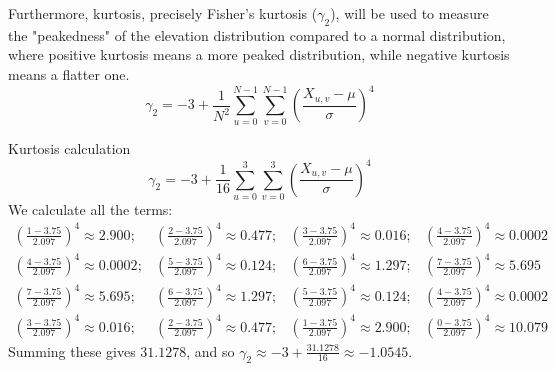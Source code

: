 Furthermore, kurtosis, precisely Fisher's kurtosis ($\gamma_2$), will be used to measure the "peakedness" of the elevation distribution compared to a normal 
distribution, where positive kurtosis means a more peaked distribution, while negative kurtosis means a flatter one.
\[\gamma_2=-3+\frac{1}{N^2}\sum_{u=0}^{N-1}\sum_{v=0}^{N-1}{\left(\frac{X_{u,v}-\mu}{\sigma}\right)}^4\]
\begin{example}{Kurtosis calculation}
    \[\gamma_2=-3+\frac{1}{16}\sum_{u=0}^{3}\sum_{v=0}^{3}{\left(\frac{X_{u,v}-\mu}{\sigma}\right)}^4\]
    We calculate all the terms:
    \begin{equation*}
        \begin{matrix}
            {\left(\frac{1-3.75}{2.097}\right)}^4\approx2.900; & {\left(\frac{2-3.75}{2.097}\right)}^4\approx0.477; & {\left(\frac{3-3.75}{2.097}\right)}^4\approx0.016; & {\left(\frac{4-3.75}{2.097}\right)}^4\approx0.0002 \\
            {\left(\frac{4-3.75}{2.097}\right)}^4\approx0.0002; & {\left(\frac{5-3.75}{2.097}\right)}^4\approx0.124; & {\left(\frac{6-3.75}{2.097}\right)}^4\approx1.297; & {\left(\frac{7-3.75}{2.097}\right)}^4\approx5.695 \\
            {\left(\frac{7-3.75}{2.097}\right)}^4\approx5.695; & {\left(\frac{6-3.75}{2.097}\right)}^4\approx1.297; & {\left(\frac{5-3.75}{2.097}\right)}^4\approx0.124; & {\left(\frac{4-3.75}{2.097}\right)}^4\approx0.0002 \\
            {\left(\frac{3-3.75}{2.097}\right)}^4\approx0.016; & {\left(\frac{2-3.75}{2.097}\right)}^4\approx0.477; & {\left(\frac{1-3.75}{2.097}\right)}^4\approx2.900; & {\left(\frac{0-3.75}{2.097}\right)}^4\approx10.079
        \end{matrix}
    \end{equation*}
    Summing these gives $31.1278$, and so $\gamma_2\approx-3+\frac{31.1278}{16}\approx-1.0545$.
\end{example}

